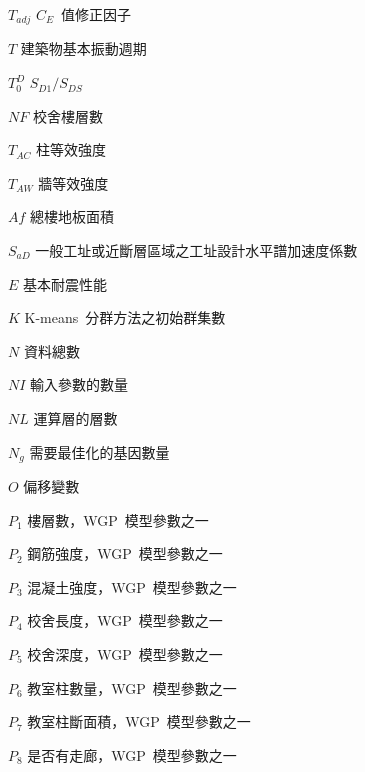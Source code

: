 \begin{SymEntry}
\item[$T_{adj}$]
$C_E$~值修正因子

\item[$T$]
建築物基本振動週期

\item[$T_0^D$]
$S_{D1}/S_{DS}$

\item[$NF$]
校舍樓層數

\item[$T_{AC}$]
柱等效強度

\item[$T_{AW}$]
牆等效強度

\item[$Af$]
總樓地板面積

\item[$S_{aD}$]
一般工址或近斷層區域之工址設計水平譜加速度係數

\item[$E$]
基本耐震性能

\item[$K$]
K-means~分群方法之初始群集數

\item[$N$]
資料總數

\item[$NI$]
輸入參數的數量

\item[$NL$]
運算層的層數

\item[$N_g$]
需要最佳化的基因數量

\item[$O$]
偏移變數

\item[$P_1$]
樓層數，WGP~模型參數之一

\item[$P_2$]
鋼筋強度，WGP~模型參數之一

\item[$P_3$]
混凝土強度，WGP~模型參數之一

\item[$P_4$]
校舍長度，WGP~模型參數之一

\item[$P_5$]
校舍深度，WGP~模型參數之一

\item[$P_6$]
教室柱數量，WGP~模型參數之一

\item[$P_7$]
教室柱斷面積，WGP~模型參數之一

\item[$P_8$]
是否有走廊，WGP~模型參數之一


\end{SymEntry}
